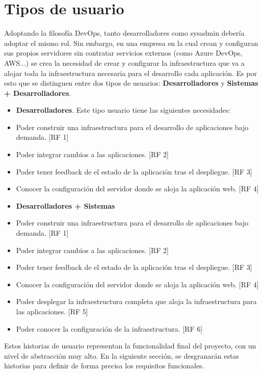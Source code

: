 \section{Tipos de usuario}
	\begin{paragraph}
		Adoptando la filosofía DevOps, tanto desarrolladores como sysadmin debería adoptar el mismo rol. Sin embargo, en una empresa en la cual crean y configuran sus propios servidores sin contratar servicios externos (como Azure DevOps, AWS...) se crea la necesidad de crear y configurar la infraestructura que va a alojar toda la infraestructura necesaria para el desarrollo cada aplicación. Es por esto que se distinguen entre dos tipos de usuarios: \textbf{Desarrolladores} y \textbf{Sistemas + Desarrolladores}.  
		
		\begin{itemize}
			\item \textbf{Desarrolladores}. Este tipo usuario tiene las siguientes necesidades:
				\item Poder construir una infraestructura para el desarrollo de aplicaciones bajo demanda. [RF 1]
				\item Poder integrar cambios a las aplicaciones. [RF 2]
				\item Poder tener feedback de el estado de la aplicación tras el despliegue. [RF 3]
				\item Conocer la configuración del servidor donde se aloja la aplicación web. [RF 4]
			\item \textbf{Desarrolladores + Sistemas}
				\item Poder construir una infraestructura para el desarrollo de aplicaciones bajo demanda. [RF 1]
				\item Poder integrar cambios a las aplicaciones. [RF 2]
				\item Poder tener feedback de el estado de la aplicación tras el despliegue. [RF 3]
				\item Conocer la configuración del servidor donde se aloja la aplicación web. [RF 4]
				\item Poder desplegar la infraestructura completa que aloja la infraestructura para las aplicaciones. [RF 5]
				\item Poder conocer la configuración de la infraestructura. [RF 6]
		\end{itemize}
	
		Estos historias de usuario representan la funcionalidad final del proyecto, con un nivel de abstracción muy alto. En la siguiente sección, se desgranarán estas historias para definir de forma precisa los requisitos funcionales. \cite{ReqF:online} 
	\end{paragraph}

